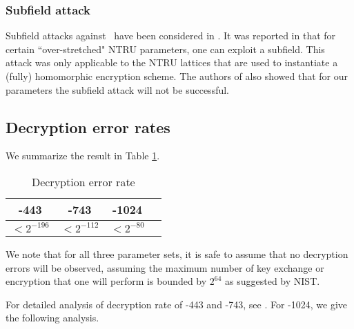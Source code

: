 \documentclass{llncs}
\newcommand{\ntru}{{\sf{NTRU}}}
\newcommand{\<}{\langle}
\renewcommand{\>}{\rangle}
\begin{document}
\subsubsection{Subfield attack}
Subfield attacks against \ntru~have been considered in \cite{subfielddjb}.
It was reported in \cite{DBLP:conf/crypto/AlbrechtBD16} that for certain ``over-stretched" NTRU parameters, one can exploit a subfield. This attack was only applicable to the NTRU lattices that are used
to instantiate a (fully) homomorphic encryption scheme. The authors of
\cite{DBLP:conf/crypto/AlbrechtBD16} also
showed that for our parameters the subfield attack will not be successful.



\subsection{Decryption error rates}
We summarize the result in Table \ref{tab:error}.

\begin{table}\centering
\caption{Decryption error rate}\label{tab:error}
\begin{tabular}{|c|c|c|c|}\hline
 \ntru-443 & \ntru-743 & \ntru-1024\\\hline
 $<2^{-196}$ & $<2^{-112}$ & $<2^{-80}$\\\hline
\end{tabular}
\end{table}

We note that for all three parameter sets, it is safe
to assume that no decryption errors will be observed,
assuming the maximum number of key exchange or encryption
that one will perform is bounded by $2^{64}$ as suggested
by NIST.


For detailed analysis of decryption rate of \ntru-443 and
\ntru-743, see \cite{DBLP:conf/ctrsa/HoffsteinPSSWZ17}.
For \ntru-1024, we give the following analysis.
\end{document}
